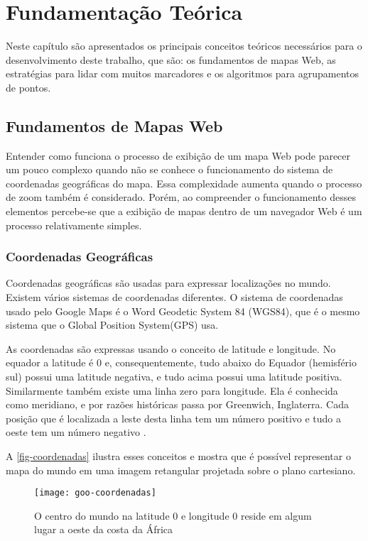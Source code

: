 \chapter{Fundamentação Teórica}

Neste capítulo são apresentados os principais conceitos teóricos necessários para o desenvolvimento deste trabalho, que são: os fundamentos de mapas Web, as estratégias para lidar com muitos marcadores e os algoritmos para agrupamentos de pontos.

\section{Fundamentos de Mapas Web}
	Entender como funciona o processo de exibição de um mapa Web pode parecer um pouco complexo quando não se conhece o funcionamento do sistema de coordenadas geográficas do mapa. Essa complexidade aumenta quando o processo de zoom também é considerado. Porém, ao compreender o funcionamento desses elementos percebe-se que a exibição de mapas dentro de um navegador Web é um processo relativamente simples.
	
	\subsection{Coordenadas Geográficas}
	Coordenadas geográficas são usadas para expressar localizações no mundo. Existem vários sistemas de coordenadas diferentes. O sistema de coordenadas usado pelo Google Maps é o Word Geodetic System 84 (WGS84), que é o mesmo sistema que o Global Position System(GPS) usa.
	
	As coordenadas são expressas usando o conceito de latitude e longitude. No equador a latitude é 0 e, consequentemente, tudo abaixo do Equador (hemisfério sul) possui uma latitude negativa, e tudo acima possui uma latitude positiva. Similarmente também existe uma linha zero para longitude. Ela é conhecida como meridiano, e por razões históricas passa por Greenwich, Inglaterra. Cada posição que é localizada a leste desta linha tem um número positivo e tudo a oeste tem um número negativo  \cite[p. 4]{livroGoogleApiV3}. 
	
	A \autoref{fig-coordenadas} ilustra esses conceitos e mostra que é possível representar o mapa do mundo em uma imagem retangular projetada sobre o plano cartesiano.
	
	\begin{figure}[htb]
	\caption{\label{fig-coordenadas} O centro do mundo na latitude 0 e longitude 0 reside em algum lugar a oeste da costa da África}
	\begin{center}
	    \texttt{[image: goo-coordenadas]}
	\end{center}
	\end{figure}
	
